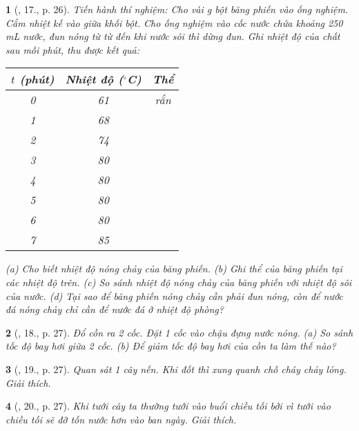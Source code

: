\documentclass{article}
\newtheorem{baitoan}{}
\begin{document}
\begin{baitoan}[\cite{ncpt_KHTN_6_tap_1}, 17., p. 26]
	Tiến hành thí nghiệm: Cho vài {\rm g} bột băng phiến vào ống nghiệm. Cắm nhiệt kế vào giữa khối bột. Cho ống nghiệm vào cốc nước chứa khoảng {\rm250 mL} nước, đun nóng từ từ đến khi nước sôi thì dừng đun. Ghi nhiệt độ của chất sau mỗi phút, thu được kết quả:
	\begin{table}[H]
		\centering
		\begin{tabular}{|c|c|c|}
			\hline
			$t$ (phút) & Nhiệt độ (${}^\circ$C) & Thể \\
			\hline
			0 & 61 & rắn \\
			\hline
			1 & 68 &  \\
			\hline
			2 & 74 &  \\
			\hline
			3 & 80 &  \\
			\hline
			4 & 80 &  \\
			\hline
			5 & 80 &  \\
			\hline
			6 & 80 &  \\
			\hline
			7 & 85 &  \\
			\hline
		\end{tabular}
	\end{table}
	\noindent(a) Cho biết nhiệt độ nóng chảy của băng phiến. (b) Ghi thể của băng phiến tại các nhiệt độ trên. (c) So sánh nhiệt độ nóng chảy của băng phiến với nhiệt độ sôi của nước. (d) Tại sao để băng phiến nóng chảy cần phải đun nóng, còn để nước đá nóng chảy chỉ cần để nước đá ở nhiệt độ phòng?
\end{baitoan}

\begin{baitoan}[\cite{ncpt_KHTN_6_tap_1}, 18., p. 27]
	Đổ cồn ra 2 cốc. Đặt 1 cốc vào chậu đựng nước nóng. (a) So sánh tốc độ bay hơi giữa 2 cốc. (b) Để giảm tốc độ bay hơi của cồn ta làm thế nào?
\end{baitoan}

\begin{baitoan}[\cite{ncpt_KHTN_6_tap_1}, 19., p. 27]
	Quan sát 1 cây nến. Khi đốt thì xung quanh chỗ cháy chảy lỏng. Giải thích.
\end{baitoan}

\begin{baitoan}[\cite{ncpt_KHTN_6_tap_1}, 20., p. 27]
	Khi tưới cây ta thường tưới vào buổi chiều tối bởi vì tưới vào chiều tối sẽ đỡ tốn nước hơn vào ban ngày. Giải thích.
\end{baitoan}
\end{document}
